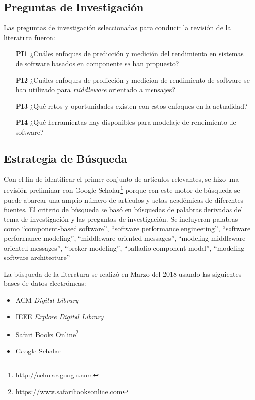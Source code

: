 \documentclass[11pt, twoside]{report}
\begin{document}
\subsection{Preguntas de Investigación}
Las preguntas de investigación seleccionadas para conducir la revisión de la literatura fueron:
\begin{enumerate}
    \item[\textbf{PI1}] ¿Cuáles enfoques de predicción y medición del rendimiento en sistemas de software basados en componente se han propuesto?
    \item[\textbf{PI2}] ¿Cuáles enfoques de predicción y medición de rendimiento de software se han utilizado para \emph{middleware} orientado a mensajes?    
    \item[\textbf{PI3}] ¿Qué retos y oportunidades existen con estos enfoques en la actualidad?
    \item[\textbf{PI4}] ¿Qué herramientas hay disponibles para modelaje de rendimiento de software?
\end{enumerate}

\subsection{Estrategia de Búsqueda}
Con el fin de identificar el primer conjunto de artículos relevantes, se hizo una revisión preliminar con Google Scholar\footnote{\url{http://scholar.google.com}} porque con este motor de búsqueda se puede abarcar una amplio número de artículos y actas académicas de diferentes fuentes. El criterio de búsqueda se basó en búsquedas de palabras derivadas del tema de investigación y las preguntas de investigación. Se incluyeron palabras como ``component-based software'', ``software performance engineering'', ``software performance modeling'', ``middleware oriented messages'', ``modeling middleware oriented messages'', ``broker modeling'', ``palladio component model'', ``modeling software architecture''

La búsqueda de la literatura se realizó en Marzo del 2018 usando las siguientes bases de datos electrónicas:
\begin{itemize}
    \item ACM \emph{Digital Library} 
    \item IEEE \emph{Explore Digital Library}
    \item Safari Books Online\footnote{\url{https://www.safaribooksonline.com}}
    \item Google Scholar
\end{itemize}
\end{document}
